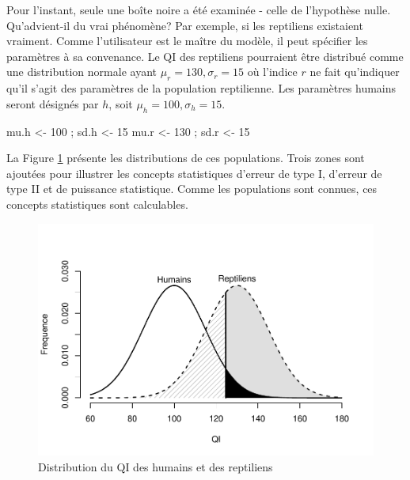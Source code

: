 \documentclass[
]{book}
\newenvironment{Shaded}{}{}
\newcommand{\DecValTok}[1]{#1}
\newcommand{\NormalTok}[1]{#1}
\newcommand{\OtherTok}[1]{#1}
\begin{document}
Pour l'instant, seule une boîte noire a été examinée - celle de l'hypothèse nulle. Qu'advient-il du vrai phénomène? Par exemple, si les reptiliens existaient vraiment. Comme l'utilisateur est le maître du modèle, il peut spécifier les paramètres à sa convenance. Le QI des reptiliens pourraient être distribué comme une distribution normale ayant \(\mu_{r}=130, \sigma_r = 15\) où l'indice \(r\) ne fait qu'indiquer qu'il s'agit des paramètres de la population reptilienne. Les paramètres humains seront désignés par \(h\), soit \(\mu_h = 100,\sigma_h = 15\).

\begin{Shaded}
\begin{Highlighting}[]
\NormalTok{mu.h }\OtherTok{\textless{}{-}} \DecValTok{100}\NormalTok{ ; sd.h }\OtherTok{\textless{}{-}} \DecValTok{15}
\NormalTok{mu.r }\OtherTok{\textless{}{-}} \DecValTok{130}\NormalTok{ ; sd.r }\OtherTok{\textless{}{-}} \DecValTok{15}
\end{Highlighting}
\end{Shaded}

La Figure \ref{fig:rh} présente les distributions de ces populations. Trois zones sont ajoutées pour illustrer les concepts statistiques d'erreur de type I, d'erreur de type II et de puissance statistique. Comme les populations sont connues, ces concepts statistiques sont calculables.

\begin{figure}

{\centering \includegraphics[width=0.9\linewidth,height=0.9\textheight]{08-Inferer_files/figure-latex/rh-1} 

}

\caption{Distribution du QI des humains et des reptiliens}\label{fig:rh}
\end{figure}
\end{document}
